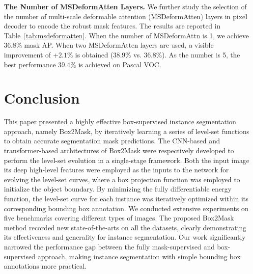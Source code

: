 \documentclass[12pt,onecolumn,letterpaper]{article}
\begin{document}
\textbf{The Number of MSDeformAtten Layers.}  We further study the selection of the number of multi-scale deformable
attention (MSDeformAtten) layers in pixel decoder to encode the robust mask features.
The results are reported in Table~\ref{tab:msdeformatten}.
When the number of MSDeformAttn is 1, we achieve 36.8$\%$ mask AP. When two MSDeformAtten layers are used, a visible improvement of +$2.1\%$ is obtained ($38.9\%$ vs. $36.8\%$). As the number is 5, the best performance $39.4\%$ is achieved on Pascal VOC.



\section{Conclusion}
This paper presented a highly effective box-supervised instance segmentation approach, namely Box2Mask, by iteratively learning a series of level-set functions to obtain accurate segmentation mask predictions. 
The CNN-based and transformer-based architectures of Box2Mask were respectively developed to perform the level-set evolution in a single-stage framework.
Both the input image its deep high-level features were employed as the inputs to the network for evolving the level-set curves, where a box projection function was employed to initialize the object boundary. By minimizing the fully differentiable energy function, the level-set curve for each instance was iteratively optimized within its corresponding bounding box annotation. We conducted extensive experiments on five benchmarks covering different types of images. The proposed Box2Mask method recorded new state-of-the-arts on all the datasets, clearly demonstrating its effectiveness and generality for instance segmentation. Our work significantly narrowed the performance gap between the fully mask-supervised and box-supervised approach, making instance segmentation with simple bounding box annotations more practical.


{\small
	
	
}
\end{document}
